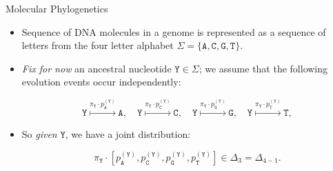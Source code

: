 \begin{frame}{Molecular Phylogenetics}

    \begin{itemize}
        \item Sequence of DNA molecules in a genome is represented as a sequence of letters from the four letter alphabet $\Sigma = \{ \texttt{A}, \texttt{C}, \texttt{G}, \texttt{T} \}$.

        \item \emph{Fix for now} an ancestral nucleotide $\texttt{Y} \in \Sigma$; we assume that the following evolution events occur independently:

        $$ \texttt{Y} \overset{ \pi_{\texttt{Y}} \cdot p_{\texttt{A}}^{(\texttt{Y})}  }{\longmapsto}  \texttt{A}, \quad \texttt{Y} \overset{ \pi_{\texttt{Y}} \cdot p_{\texttt{C}}^{(\texttt{Y})}  }{\longmapsto} \texttt{C}, \quad \texttt{Y} \overset{ \pi_{\texttt{Y}} \cdot p_{\texttt{G}}^{(\texttt{Y})}  }{\longmapsto} \texttt{G}, \quad \texttt{Y} \overset{ \pi_{\texttt{Y}} \cdot p_{\texttt{T}}^{(\texttt{Y})}  }{\longmapsto} \texttt{T}, $$ 

        \item So \emph{given} $\texttt{Y}$, we have a joint distribution:
        
        $$ \pi_{\texttt{Y}} \cdot [ p_{\texttt{A}}^{(\texttt{Y})}, p_{\texttt{C}}^{(\texttt{Y})}, p_{\texttt{G}}^{(\texttt{Y})}, p_{\texttt{T}}^{(\texttt{Y})} ] \in \Delta_{3} = \Delta_{4-1}. $$

    \end{itemize}

\end{frame}

